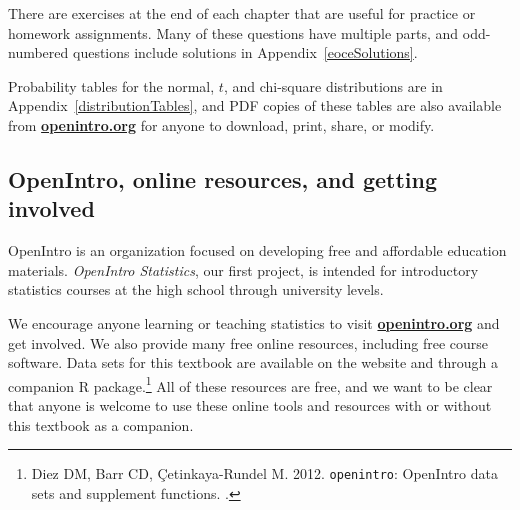 \begin{doublespace}
There are exercises at the end of each chapter that are useful for practice or homework assignments. Many of these questions have multiple parts, and odd-numbered questions include solutions in Appendix~\ref{eoceSolutions}. %

Probability tables for the normal, $t$, and chi-square distributions are in Appendix~\ref{distributionTables}, and PDF copies of these tables are also available from \href{http://www.openintro.org}{\color{black}\textbf{openintro.org}} for anyone to download, print, share, or modify.

\subsection*{OpenIntro, online resources, and getting involved}

OpenIntro is an organization focused on developing free and affordable education materials. \emph{OpenIntro Statistics}, our first project, is intended for introductory statistics courses at the high school through university levels.


We encourage anyone learning or teaching statistics to visit \href{http://www.openintro.org}{\color{black}\textbf{openintro.org}} and get involved. We also provide many free online resources, including free course software. 
Data sets for this textbook are available on the website and through a companion R package.\footnote{Diez DM, Barr CD, \c{C}etinkaya-Rundel M. 2012. \texttt{openintro}: OpenIntro data sets and supplement functions. .} All of these resources are free, and we want to be clear that anyone is welcome to use these online tools and resources with or without this textbook as a companion.


\end{doublespace}
